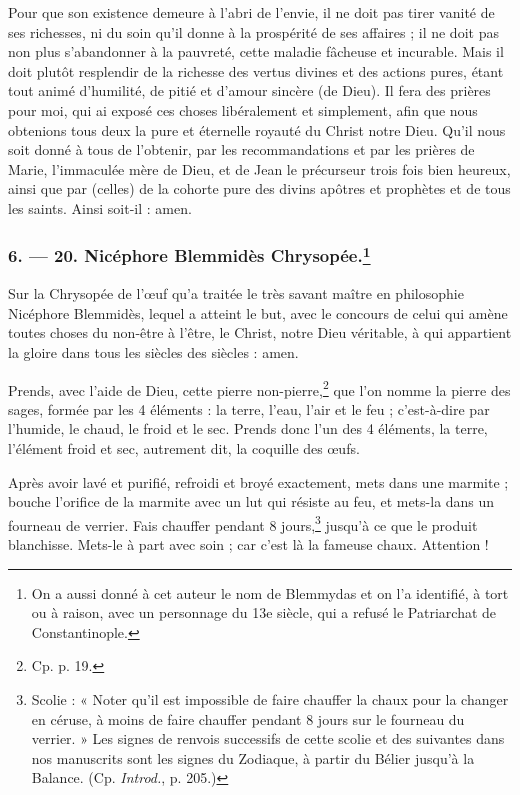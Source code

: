 \documentclass[a4paper, 11pt, oneside, polutonikogreek, french]{article}
\begin{document}
Pour que son existence demeure à l'abri de l'envie, il ne doit pas tirer vanité de ses richesses, ni du soin qu'il donne à la prospérité de ses affaires ; il ne doit pas non plus s'abandonner à la pauvreté, cette maladie fâcheuse et incurable. Mais il doit plutôt resplendir de la richesse des vertus divines et des actions pures, étant tout animé d'humilité, de pitié et d'amour sincère (de Dieu). Il fera des prières pour moi, qui ai exposé ces choses libéralement et simplement, afin que nous obtenions tous deux la pure et éternelle royauté du Christ notre Dieu. Qu'il nous soit donné à tous de l'obtenir, par les recommandations et par les prières de Marie, l'immaculée mère de Dieu, et de Jean le précurseur trois fois bien heureux, ainsi que par (celles) de la cohorte pure des divins apôtres et prophètes et de tous les saints. Ainsi soit-il : amen.

\bigskip
\centerline{\EightStarTaper}
\centerline{\EightStarTaper\EightStarTaper}
\bigskip

\subsubsection[6. --- 20. Nicéphore Blemmidès Chrysopée.]{6. --- 20. Nicéphore Blemmidès Chrysopée.\footnote{On a aussi donné à cet auteur le nom de Blemmydas et on l'a identifié, à tort ou à raison, avec un personnage du 13e siècle, qui a refusé le Patriarchat de Constantinople.}}

Sur la Chrysopée de l'œuf qu'a traitée le très savant maître en philosophie Nicéphore Blemmidès, lequel a atteint le but, avec le concours de celui qui amène toutes choses du non-être à l'être, le Christ, notre Dieu véritable, à qui appartient la gloire dans tous les siècles des siècles : amen.

Prends, avec l'aide de Dieu, cette pierre non-pierre,\footnote{Cp. p. 19.} que l'on nomme la pierre des sages, formée par les 4 éléments : la terre, l'eau, l'air et le feu ; c'est-à-dire par l'humide, le chaud, le froid et le sec. Prends donc l'un des 4 éléments, la terre, l'élément froid et sec, autrement dit, la coquille des œufs.

Après avoir lavé et purifié, refroidi et broyé exactement, mets dans une marmite ; bouche l'orifice de la marmite avec un lut qui résiste au feu, et mets-la dans un fourneau de verrier. Fais chauffer pendant 8 jours,\footnote{Scolie : « Noter qu'il est impossible de faire chauffer la chaux pour la changer en céruse, à moins de faire chauffer pendant 8 jours sur le fourneau du verrier. » Les signes de renvois successifs de cette scolie et des suivantes dans nos manuscrits sont les signes du Zodiaque, à partir du Bélier jusqu'à la Balance. (Cp. \emph{Introd.}, p. 205.)} jusqu'à ce que le produit blanchisse. Mets-le à part avec soin ; car c'est là la fameuse chaux. Attention !
\end{document}
